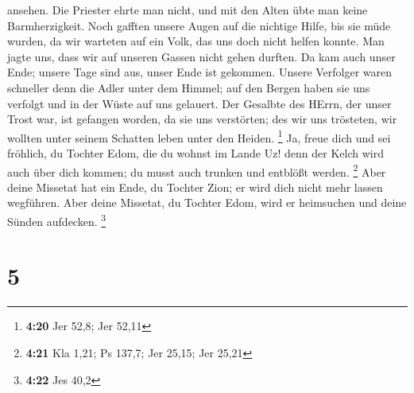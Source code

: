 ansehen. Die Priester ehrte man nicht, und mit den Alten übte man keine
Barmherzigkeit.  Noch gafften unsere Augen auf die nichtige
Hilfe, bis sie müde wurden, da wir warteten auf ein Volk, das uns doch
nicht helfen konnte.  Man jagte uns, dass wir auf unseren
Gassen nicht gehen durften. Da kam auch unser Ende; unsere Tage sind
aus, unser Ende ist gekommen.  Unsere Verfolger waren
schneller denn die Adler unter dem Himmel; auf den Bergen haben sie uns
verfolgt und in der Wüste auf uns gelauert.  Der Gesalbte
des HErrn, der unser Trost war, ist gefangen worden, da sie uns
verstörten; des wir uns trösteten, wir wollten unter seinem Schatten
leben unter den Heiden. \footnote{\textbf{4:20} Jer 52,8; Jer 52,11}
 Ja, freue dich und sei fröhlich, du Tochter Edom, die du
wohnst im Lande Uz! denn der Kelch wird auch über dich kommen; du musst
auch trunken und entblößt werden. \footnote{\textbf{4:21} Kla 1,21; Ps
  137,7; Jer 25,15; Jer 25,21}  Aber deine Missetat hat ein
Ende, du Tochter Zion; er wird dich nicht mehr lassen wegführen. Aber
deine Missetat, du Tochter Edom, wird er heimsuchen und deine Sünden
aufdecken. \footnote{\textbf{4:22} Jes 40,2}

\hypertarget{section-1}{%
\section{5}\label{section-1}}

